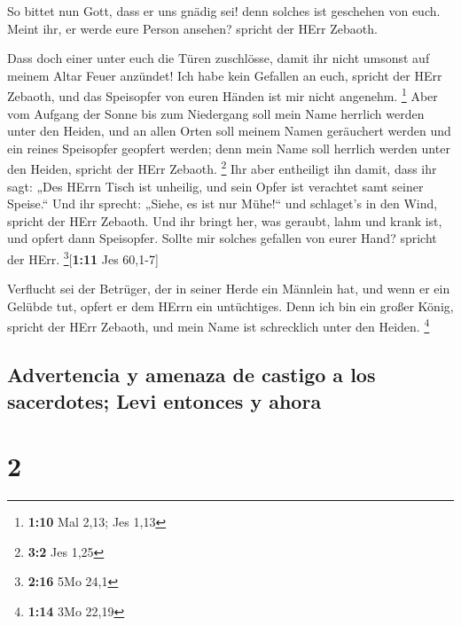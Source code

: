  So bittet nun Gott, dass er uns gnädig sei! denn solches
ist geschehen von euch. Meint ihr, er werde eure Person ansehen? spricht
der HErr Zebaoth.

 Dass doch einer unter euch die Türen zuschlösse, damit
ihr nicht umsonst auf meinem Altar Feuer anzündet! Ich habe kein
Gefallen an euch, spricht der HErr Zebaoth, und das Speisopfer von euren
Händen ist mir nicht angenehm. \footnote{\textbf{1:10} Mal 2,13; Jes
  1,13}  Aber vom Aufgang der Sonne bis zum Niedergang
soll mein Name herrlich werden unter den Heiden, und an allen Orten soll
meinem Namen geräuchert werden und ein reines Speisopfer geopfert
werden; denn mein Name soll herrlich werden unter den Heiden, spricht
der HErr Zebaoth. \footnote{\textbf{3:2} Jes 1,25}  Ihr
aber entheiligt ihn damit, dass ihr sagt: „Des HErrn Tisch ist unheilig,
und sein Opfer ist verachtet samt seiner Speise.``  Und
ihr sprecht: „Siehe, es ist nur Mühe!{}`` und schlaget's in den Wind,
spricht der HErr Zebaoth. Und ihr bringt her, was geraubt, lahm und
krank ist, und opfert dann Speisopfer. Sollte mir solches gefallen von
eurer Hand? spricht der HErr. \footnote{\textbf{2:16} 5Mo 24,1}{[}\textbf{1:11}
Jes 60,1-7{]}

 Verflucht sei der Betrüger, der in seiner Herde ein
Männlein hat, und wenn er ein Gelübde tut, opfert er dem HErrn ein
untüchtiges. Denn ich bin ein großer König, spricht der HErr Zebaoth,
und mein Name ist schrecklich unter den Heiden. \footnote{\textbf{1:14}
  3Mo 22,19}

\hypertarget{advertencia-y-amenaza-de-castigo-a-los-sacerdotes-levi-entonces-y-ahora}{%
\subsection{Advertencia y amenaza de castigo a los sacerdotes; Levi
entonces y
ahora}\label{advertencia-y-amenaza-de-castigo-a-los-sacerdotes-levi-entonces-y-ahora}}

\hypertarget{section-1}{%
\section{2}\label{section-1}}

